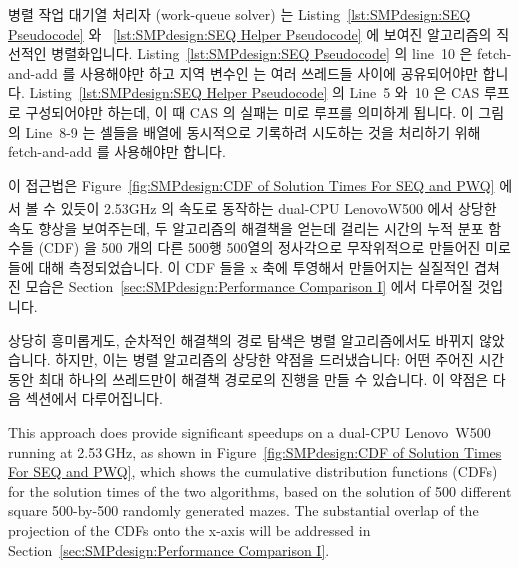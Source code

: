 병렬 작업 대기열 처리자 (work-queue solver) 는
Listing~\ref{lst:SMPdesign:SEQ Pseudocode} 와
~\ref{lst:SMPdesign:SEQ Helper Pseudocode} 에 보여진 알고리즘의 직선적인
병렬화입니다.
Listing~\ref{lst:SMPdesign:SEQ Pseudocode} 의 line~10 은 fetch-and-add 를
사용해야만 하고 지역 변수인  는 여러 쓰레드들 사이에 공유되어야만
합니다.
Listing~\ref{lst:SMPdesign:SEQ Helper Pseudocode} 의 Line~5 와~10 은 CAS 루프로
구성되어야만 하는데, 이 때 CAS 의 실패는 미로 루프를 의미하게 됩니다.
이 그림의 Line~8-9 는 셀들을  배열에 동시적으로 기록하려
시도하는 것을 처리하기 위해 fetch-and-add 를 사용해야만 합니다.

이 접근법은 Figure~\ref{fig:SMPdesign:CDF of Solution Times For SEQ and PWQ}
에서 볼 수 있듯이 2.53GHz 의 속도로 동작하는 dual-CPU
Lenovo\textsuperscript\texttrademark W500 에서 상당한 속도 향상을 보여주는데,
두 알고리즘의 해결책을 얻는데 걸리는 시간의 누적 분포 함수들 (CDF) 을 500 개의
다른 500행 500열의 정사각으로 무작위적으로 만들어진 미로들에 대해
측정되었습니다.
이 CDF 들을 x 축에 투영해서 만들어지는 실질적인 겹쳐진 모습은
Section~\ref{sec:SMPdesign:Performance Comparison I} 에서 다루어질 것입니다.

상당히 흥미롭게도, 순차적인 해결책의 경로 탐색은 병렬 알고리즘에서도 바뀌지
않았습니다.
하지만, 이는 병렬 알고리즘의 상당한 약점을 드러냈습니다:
어떤 주어진 시간 동안 최대 하나의 쓰레드만이 해결책 경로로의 진행을 만들 수
있습니다.
이 약점은 다음 섹션에서 다루어집니다.
\iffalse


This approach does provide significant speedups on a dual-CPU
Lenovo\mytexttrademark\ W500
running at 2.53\,GHz, as shown in
Figure~\ref{fig:SMPdesign:CDF of Solution Times For SEQ and PWQ},
which shows the cumulative distribution functions (CDFs) for the solution
times of the two algorithms, based on the solution of 500 different square
500-by-500 randomly generated mazes.
The substantial overlap
of the projection of the CDFs onto the x-axis will be addressed in
Section~\ref{sec:SMPdesign:Performance Comparison I}.

